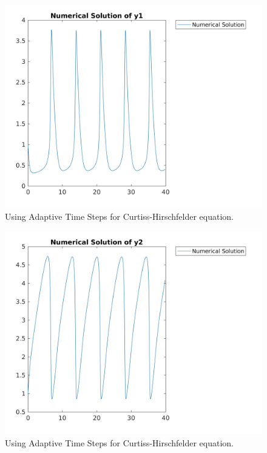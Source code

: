 \documentclass[9pt]{beamer}
\numberwithin{equation}{section}
\begin{document}
\begin{frame}
\begin{figure}
\centering
\includegraphics[scale=0.15]{ats_b_y1}
\caption{Using Adaptive Time Steps for Curtiss-Hirschfelder equation.}
\end{figure}
\end{frame}

\begin{frame}
\begin{figure}
\centering
\includegraphics[scale=0.15]{ats_b_y2}
\caption{Using Adaptive Time Steps for Curtiss-Hirschfelder equation.}
\end{figure}
\end{frame}
\end{document}
